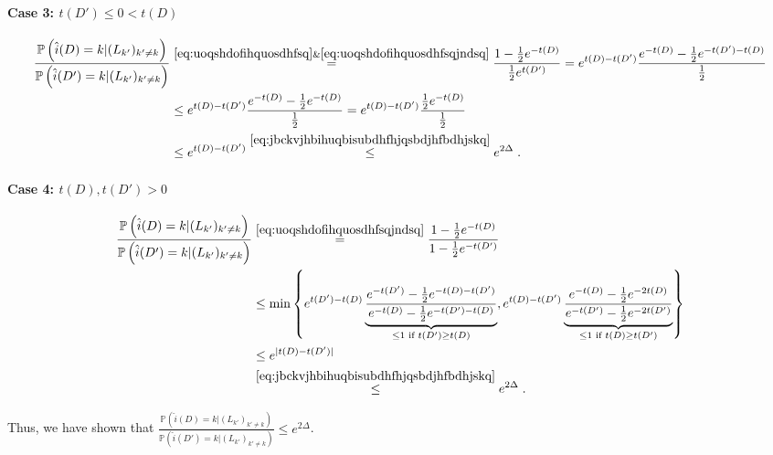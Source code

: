 \documentclass{article}
\theoremstyle{plain}
\theoremstyle{definition}
\theoremstyle{remark}
\newcommand{\Prob}[0]{\mathbb{P}}
\newcommand\p[1]{\left( {#1}\right)}
\begin{document}
\paragraph{Case 3: $t(D')\leq 0 < t(D)$}

\begin{equation}
    \begin{aligned}
        \frac{\Prob \p{\hat{i}(D) = k | (L_{k'})_{k' \neq k}}}{\Prob \p{\hat{i}(D') = k | (L_{k'})_{k' \neq k}}}
        &\stackrel{\eqref{eq:uoqshdofihquosdhfsq} \& \eqref{eq:uoqshdofihquosdhfsqjndsq}}{=}
        \frac{1 - \frac{1}{2} e^{-t(D)}}{\frac{1}{2} e^{t(D')}}
        =
        e^{t(D) - t(D')} \frac{e^{-t(D)} - \frac{1}{2} e^{-t(D')-t(D)}}{\frac{1}{2}} \\
        &\leq e^{t(D) - t(D')} \frac{e^{-t(D)} - \frac{1}{2} e^{-t(D)}}{\frac{1}{2}} = e^{t(D) - t(D')} \frac{\frac{1}{2} e^{-t(D)}}{\frac{1}{2}} \\
        &\leq e^{t(D) - t(D')} \stackrel{\eqref{eq:jbckvjhbihuqbisubdhfhjqsbdjhfbdhjskq}}{\leq} e^{2 \Delta}\;.
    \end{aligned}
\end{equation}

\paragraph{Case 4: $t(D), t(D') > 0$}

\begin{equation}
    \begin{aligned}
        \frac{\Prob \p{\hat{i}(D) = k | (L_{k'})_{k' \neq k}}}{\Prob \p{\hat{i}(D') = k | (L_{k'})_{k' \neq k}}}
        &\stackrel{\eqref{eq:uoqshdofihquosdhfsqjndsq}}{=}
        \frac{1 - \frac{1}{2} e^{-t(D)}}{1 - \frac{1}{2} e^{-t(D')}} \\
        &\leq \min \left\{ e^{t(D') - t(D)} \underbrace{\frac{e^{-t(D')} - \frac{1}{2} e^{-t(D)-t(D')}}{e^{-t(D)} - \frac{1}{2} e^{-t(D')-t(D)}}}_{\leq 1 \text{ if } t(D') \geq t(D)}, e^{t(D) - t(D')} \underbrace{\frac{e^{-t(D)} - \frac{1}{2} e^{-2 t(D)}}{e^{-t(D')} - \frac{1}{2} e^{-2 t(D')}}}_{\leq 1 \text{ if } t(D) \geq t(D')} \right\} \\
        &\leq e^{|t(D) - t(D')|} \\
        &\stackrel{\eqref{eq:jbckvjhbihuqbisubdhfhjqsbdjhfbdhjskq}}{\leq} e^{2 \Delta} \;.
    \end{aligned}
\end{equation}

Thus, we have shown that $\frac{\Prob \p{\hat{i}(D) = k | (L_{k'})_{k' \neq k}} }{\Prob \p{\hat{i}(D') = k | (L_{k'})_{k' \neq k}} } \leq e^{2 \Delta}$. 
\end{document}
